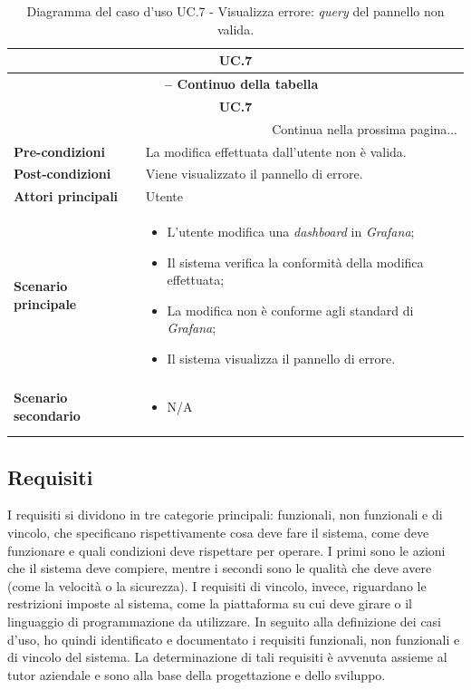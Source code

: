 \begin{center}
\begin{longtable}{|p{}|p{}|}
\hline
\multicolumn{2}{|c|}{\textbf{UC.7}}\\ 
\hline 
\endfirsthead
\multicolumn{2}{c}{{\bfseries \tablename\ \thetable{} -- Continuo della tabella}}\\
\hline
\multicolumn{2}{|c|}{\textbf{UC.7}}\\ \hline 
\endhead
\hline
\multicolumn{2}{|r|}{{Continua nella prossima pagina...}}\\
\hline
\endfoot
\endlastfoot
\textbf{Pre-condizioni} & La modifica effettuata dall'utente non è valida. \\ \hline
\textbf{Post-condizioni} & Viene visualizzato il pannello di errore. \\ \hline
\textbf{Attori principali} & Utente \\ \hline
\textbf{Scenario principale} & 
\begin{itemize}
    \item L'utente modifica una \textit{dashboard} in \textit{Grafana};
    \item Il sistema verifica la conformità della modifica effettuata;
    \item La modifica non è conforme agli standard di \textit{Grafana};
    \item Il sistema visualizza il pannello di errore.
\end{itemize} \\ \hline
\textbf{Scenario secondario} & 
\begin{itemize}
    \item N/A
\end{itemize} \\ \hline
\caption{Diagramma del caso d'uso UC.7 - Visualizza errore: \textit{query} del pannello non valida.}
\label{tab:uc-7}
\end{longtable}
\end{center}
\subsection{Requisiti}
\label{requisiti}
I requisiti si dividono in tre categorie principali: funzionali, non funzionali e di vincolo, che specificano rispettivamente cosa deve fare il sistema, come deve funzionare e quali condizioni deve rispettare per operare. 
I primi sono le azioni che il sistema deve compiere, mentre i secondi sono le qualità che deve avere (come la velocità o la sicurezza). 
I requisiti di vincolo, invece, riguardano le restrizioni imposte al sistema, come la piattaforma su cui deve girare o il linguaggio di programmazione da utilizzare. 
In seguito alla definizione dei casi d'uso, ho quindi identificato e documentato i requisiti funzionali, non funzionali e di vincolo del sistema.
La determinazione di tali requisiti è avvenuta assieme al tutor aziendale e sono alla base della progettazione e dello sviluppo.

